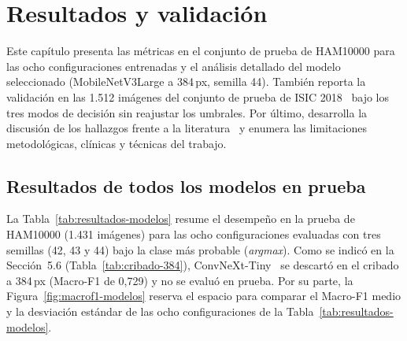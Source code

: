 \chapter{Resultados y validación}

Este capítulo presenta las métricas en el conjunto de prueba de HAM10000 para las ocho configuraciones entrenadas y el análisis detallado del modelo seleccionado (MobileNetV3Large a 384\,px, semilla 44). También reporta la validación en las 1.512 imágenes del conjunto de prueba de ISIC 2018~\cite{codella2019isic2018} bajo los tres modos de decisión sin reajustar los umbrales. Por último, desarrolla la discusión de los hallazgos frente a la literatura~\cite{maierhein2024metrics,barata2023reinforcement} y enumera las limitaciones metodológicas, clínicas y técnicas del trabajo.

\section{Resultados de todos los modelos en prueba}

La Tabla~\ref{tab:resultados-modelos} resume el desempeño en la prueba de HAM10000 (1.431 imágenes) para las ocho configuraciones evaluadas con tres semillas (42, 43 y 44) bajo la clase más probable (\textit{argmax}). Como se indicó en la Sección~5.6 (Tabla~\ref{tab:cribado-384}), ConvNeXt-Tiny~\cite{liu2022convnext} se descartó en el cribado a 384\,px (Macro-F1 de 0,729) y no se evaluó en prueba. Por su parte, la Figura~\ref{fig:macrof1-modelos} reserva el espacio para comparar el Macro-F1 medio y la desviación estándar de las ocho configuraciones de la Tabla~\ref{tab:resultados-modelos}.

